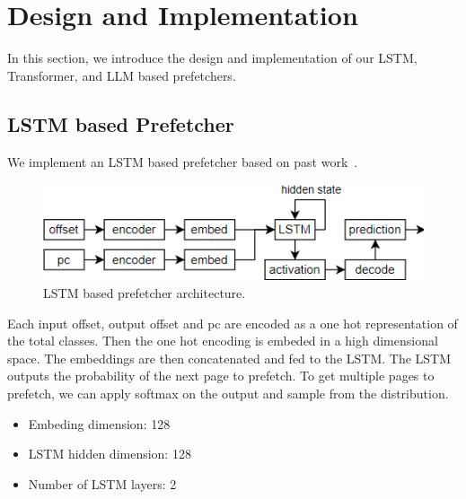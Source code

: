 \section{Design and Implementation} \label{sec:4}

In this section, we introduce the design and implementation of our LSTM, Transformer, and LLM based prefetchers. 


\subsection{LSTM based Prefetcher} \label{sec:4.1}

We implement an LSTM based prefetcher based on past work~\cite{LMAP}. 
\begin{figure}[]
\centering
\includegraphics[width=\columnwidth]{images/LSTM.png}
\caption{LSTM based prefetcher architecture.}
\label{fig:lstm}
\end{figure}

Each input offset, output offset and pc are encoded as a one hot representation of the total classes. Then the one hot encoding is embeded in a high dimensional space. The embeddings are then concatenated and fed to the LSTM. The LSTM outputs the probability of the next page to prefetch. To get multiple pages to prefetch, we can apply softmax on the output and sample from the distribution. 

\begin{itemize}
    \item Embeding dimension: 128
    \item LSTM hidden dimension: 128
    \item Number of LSTM layers: 2
\end{itemize}

